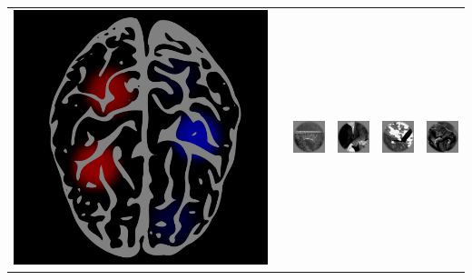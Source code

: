 \documentclass{beamer}
\begin{document}
\begin{frame}
\begin{center}
\begin{tabular}{c|c|cccc}
\includegraphics[scale = 0.035]{brain3.png} & \hspace{0.5in} 
& \includegraphics[scale = .26]{img1.png}
& \includegraphics[scale = .26]{img2.png}
& \includegraphics[scale = .26]{img3.png}
& \includegraphics[scale = .26]{img4.png}\\

\end{tabular}
\end{center}
\end{frame}
\end{document}
